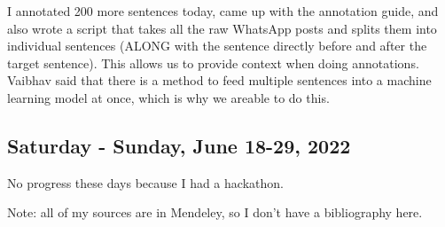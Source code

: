\documentclass[11pt,letterpaper]{article}
\begin{document}
I annotated 200 more sentences today, came up with the annotation guide, and also wrote a script that takes all the raw WhatsApp posts and splits them into individual sentences (ALONG with the sentence directly before and after the target sentence). This allows us to provide context when doing annotations. Vaibhav said that there is a method to feed multiple sentences into a machine learning model at once, which is why we areable to do this.

\subsection{Saturday - Sunday, June 18-29, 2022}
No progress these days because I had a hackathon.

\newpage
Note: all of my sources are in Mendeley, so I don't have a bibliography here.
\end{document}
